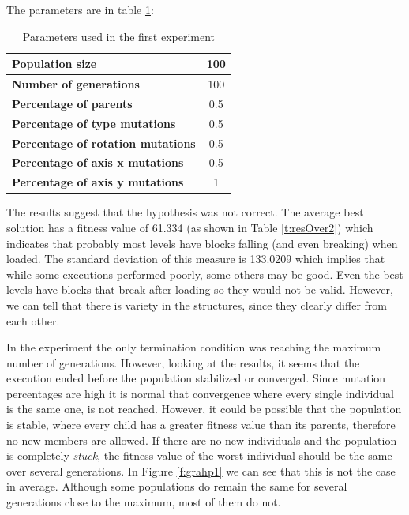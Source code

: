 \documentclass[sigconf]{acmart}
\newcommand{\myfloatalign}{\centering} %
\begin{document}
The parameters are in table \ref{t:base}: %

\begin{table}
	\myfloatalign
	\caption{Parameters used in the first experiment} 
	\label{t:base}
	\begin{tabular}{lc}
		\hline
		\textbf{Population size} & 100 \\ \hline
		\textbf{Number of generations} & 100 \\  \hline
		\textbf{Percentage of parents} &  0.5 \\  \hline
		\textbf{Percentage of type mutations} & 0.5 \\  \hline
		\textbf{Percentage of rotation mutations} & 0.5 \\  \hline
		\textbf{Percentage of axis x mutations}  & 0.5 \\  \hline
		\textbf{Percentage of axis y mutations}  & 1 \\  \hline
	\end{tabular}
\end{table}

The results suggest that the hypothesis was not correct. The average best 
solution has a fitness value of 61.334 (as shown in Table \ref{t:resOver2}) 
which indicates that probably most levels have blocks falling (and even 
breaking) when loaded. The standard deviation of this measure is 133.0209 which 
implies that while some executions performed poorly, some others may be good. 
Even the best levels have blocks that break after loading so they would not be 
valid. However, we can tell that there is variety in the structures, since they 
clearly differ from each other. 

In the experiment the only termination condition was reaching the maximum 
number of generations. However, looking at the results, it seems that the 
execution ended before the population stabilized or converged. Since mutation 
percentages are high it is normal that convergence where every single 
individual is the same one, is not reached. However, it could be possible that 
the population is stable, where every child has a greater fitness value than 
its parents, therefore no new members are allowed. If there are no new 
individuals and the population is completely \textit{stuck}, the fitness value 
of the worst individual should be the same over several generations. In Figure 
\ref{f:grahp1} we can see that this is not the case in average. Although some 
populations do remain the same for several generations close to the maximum, 
most of them do not.
\end{document}
